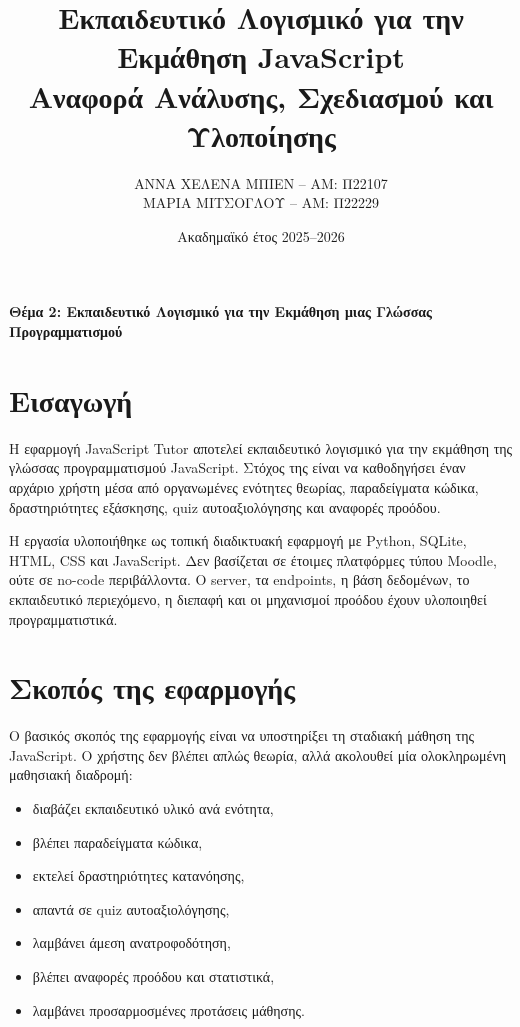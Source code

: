 \documentclass[a4paper]{article}
\title{\textbf{Εκπαιδευτικό Λογισμικό για την Εκμάθηση JavaScript}\\
\large Αναφορά Ανάλυσης, Σχεδιασμού και Υλοποίησης}
\author{
ΑΝΝΑ ΧΕΛΕΝΑ ΜΠΙΕΝ -- ΑΜ: Π22107\\
ΜΑΡΙΑ ΜΙΤΣΟΓΛΟΥ -- ΑΜ: Π22229
}
\date{Ακαδημαϊκό έτος 2025--2026}
\newcommand{\textlatin}[1]{\textenglish{#1}}
\begin{document}
\maketitle

\begin{center}
\textbf{Θέμα 2: Εκπαιδευτικό Λογισμικό για την Εκμάθηση μιας Γλώσσας Προγραμματισμού}
\end{center}

\tableofcontents
\newpage

\section{Εισαγωγή}

Η εφαρμογή \textlatin{JavaScript Tutor} αποτελεί εκπαιδευτικό λογισμικό για την εκμάθηση της γλώσσας προγραμματισμού \textlatin{JavaScript}. Στόχος της είναι να καθοδηγήσει έναν αρχάριο χρήστη μέσα από οργανωμένες ενότητες θεωρίας, παραδείγματα κώδικα, δραστηριότητες εξάσκησης, quiz αυτοαξιολόγησης και αναφορές προόδου.

Η εργασία υλοποιήθηκε ως τοπική διαδικτυακή εφαρμογή με \textlatin{Python}, \textlatin{SQLite}, \textlatin{HTML}, \textlatin{CSS} και \textlatin{JavaScript}. Δεν βασίζεται σε έτοιμες πλατφόρμες τύπου \textlatin{Moodle}, ούτε σε no-code περιβάλλοντα. Ο server, τα endpoints, η βάση δεδομένων, το εκπαιδευτικό περιεχόμενο, η διεπαφή και οι μηχανισμοί προόδου έχουν υλοποιηθεί προγραμματιστικά.

\section{Σκοπός της εφαρμογής}

Ο βασικός σκοπός της εφαρμογής είναι να υποστηρίξει τη σταδιακή μάθηση της \textlatin{JavaScript}. Ο χρήστης δεν βλέπει απλώς θεωρία, αλλά ακολουθεί μία ολοκληρωμένη μαθησιακή διαδρομή:

\begin{itemize}[leftmargin=1.2cm]
  \item διαβάζει εκπαιδευτικό υλικό ανά ενότητα,
  \item βλέπει παραδείγματα κώδικα,
  \item εκτελεί δραστηριότητες κατανόησης,
  \item απαντά σε quiz αυτοαξιολόγησης,
  \item λαμβάνει άμεση ανατροφοδότηση,
  \item βλέπει αναφορές προόδου και στατιστικά,
  \item λαμβάνει προσαρμοσμένες προτάσεις μάθησης.
\end{itemize}
\end{document}
